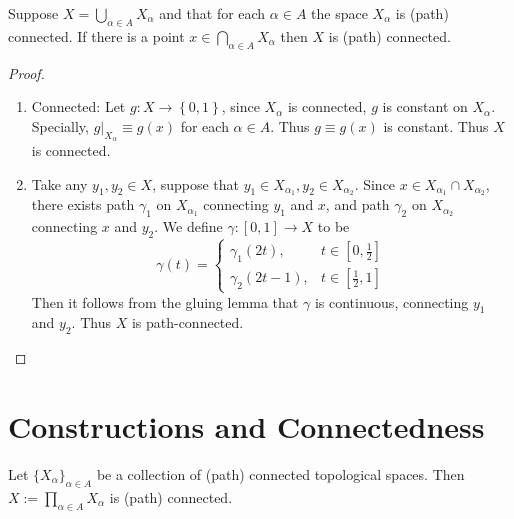 \documentclass[../main.tex]{subfiles}
\begin{document}
\begin{theorem}{}{}
Suppose $X = \bigcup_{\alpha \in A} X_{\alpha}$ and that for each $\alpha \in A$ the space $X_{\alpha}$ is (path) connected. If there is a point $x \in \bigcap_{\alpha \in A} X_{\alpha}$ then $X$ is (path) connected.
\end{theorem}
\begin{proof}
    \begin{enumerate}
        \item Connected: Let \(  g: X\to \left\{ 0,1 \right\}  \), since \(  X_{\alpha }   \) is connected, \(  g  \) is constant on \(  X_{\alpha }  \). Specially, \(  g|_{X_{\alpha }}\equiv g\left( x \right)   \) for each \(  \alpha \in A  \). Thus \(  g \equiv g\left( x \right)   \) is constant. Thus \(  X  \) is connected.
        \item Take any \(  y_1,y_2\in X  \), suppose that \(  y_1\in X_{\alpha _1 }, y_2\in X_{\alpha _2 }  \). Since \(  x \in X_{\alpha _1 }\cap X_{\alpha _2 }  \), there exists path \(   \gamma _1   \) on \(  X_{\alpha _1 }   \) connecting \(  y_1  \) and \(  x  \), and path \(   \gamma _2   \) on \(  X_{\alpha _2 }  \) connecting \(  x  \) and \(  y_2  \). We define \(   \gamma  :\left[ 0,1 \right]\to X   \) to be \[
         \gamma \left( t \right)= \begin{cases}  \gamma _1 \left( 2t \right),& t\in \left[ 0,\frac{1 }{2 }  \right]\\ 
           \gamma _2 \left( 2t-1 \right) , & t \in \left[ \frac{1 }{2 },1  \right]     \end{cases}  
        \]           Then it follows from the gluing lemma that \(   \gamma   \) is continuous, connecting \(  y_1  \) and \(  y_2  \).  Thus \(  X  \) is path-connected.              
    \end{enumerate}
    
\end{proof}

\section{Constructions and Connectedness}


\begin{theorem}{}{}
Let $\{X_\alpha\}_{\alpha\in A}$ be a collection of (path) connected topological spaces. Then $X := \prod_{\alpha\in A} X_\alpha$ is (path) connected.
\end{theorem}
\end{document}

